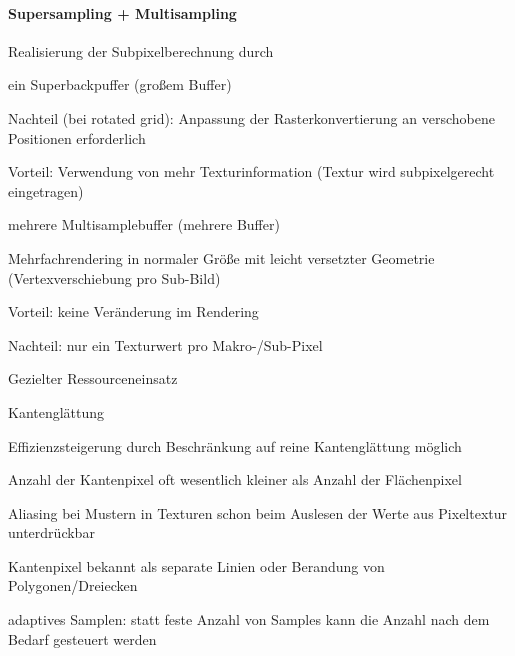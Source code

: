 \documentclass[landscape]{article}
\begin{document}
\begin{multicols}{3}
  \paragraph{Supersampling + Multisampling}
  \begin{itemize*}
    \item Realisierung der Subpixelberechnung durch
    \item ein Superbackpuffer (großem Buffer)
          \begin{itemize*}
            \item Nachteil (bei rotated grid): Anpassung der Rasterkonvertierung an verschobene Positionen erforderlich
            \item Vorteil: Verwendung von mehr Texturinformation (Textur wird subpixelgerecht eingetragen)
          \end{itemize*}
    \item mehrere Multisamplebuffer (mehrere Buffer)
          \begin{itemize*}
            \item Mehrfachrendering in normaler Größe mit leicht versetzter Geometrie (Vertexverschiebung pro Sub-Bild)
            \item Vorteil: keine Veränderung im Rendering
            \item Nachteil: nur ein Texturwert pro Makro-/Sub-Pixel
          \end{itemize*}
    \item Gezielter Ressourceneinsatz
          \begin{itemize*} 
            \item Kantenglättung
                  \begin{itemize*} 
                    \item Effizienzsteigerung durch Beschränkung auf reine Kantenglättung möglich
                    \item Anzahl der Kantenpixel oft wesentlich kleiner als Anzahl der Flächenpixel
                    \item Aliasing bei Mustern in Texturen schon beim Auslesen der Werte aus Pixeltextur unterdrückbar
                    \item Kantenpixel bekannt als separate Linien oder Berandung von Polygonen/Dreiecken
                  \end{itemize*}
            \item adaptives Samplen: statt feste Anzahl von Samples kann die Anzahl nach dem Bedarf gesteuert werden
          \end{itemize*}
  \end{itemize*}
  

\end{multicols}
\end{document}
